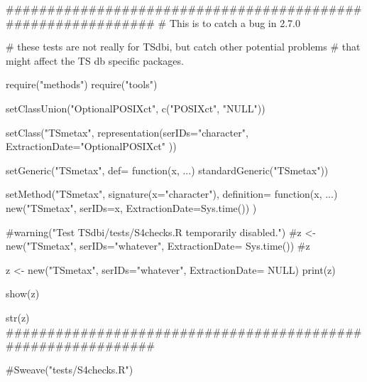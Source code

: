 \documentclass[english]{article}
\begin{document}
#############################################################
# This is to catch a bug in 2.7.0 

\begin{Scode}
# these tests are not really for TSdbi, but catch other potential problems 
#  that might affect the TS db specific packages.

require("methods")
require("tools")

setClassUnion("OptionalPOSIXct",   c("POSIXct",   "NULL"))

setClass("TSmetax", 
  representation(serIDs="character", ExtractionDate="OptionalPOSIXct" )) 

setGeneric("TSmetax", 
   def= function(x, ...) standardGeneric("TSmetax"))

setMethod("TSmetax",   signature(x="character"),
   definition= function(x, ...){
       new("TSmetax", serIDs=x, ExtractionDate=Sys.time())
       } )

#warning("Test TSdbi/tests/S4checks.R temporarily disabled.")
#z <- new("TSmetax", serIDs="whatever", ExtractionDate= Sys.time())
#z

z <- new("TSmetax", serIDs="whatever", ExtractionDate= NULL)
print(z)

show(z)

str(z)
#############################################################
\end{Scode}
#Sweave("tests/S4checks.R")
\end{document}
